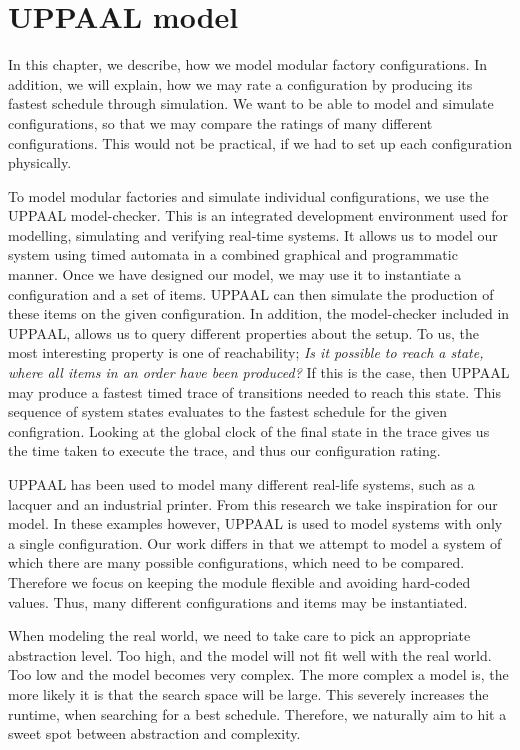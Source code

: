 \chapter{UPPAAL model}\label{ch:uppaalmodel}
In this chapter, we describe, how we model modular factory configurations. In addition, we will explain, how we may rate a configuration by producing its fastest schedule through simulation. We want to be able to model and simulate configurations, so that we may compare the ratings of many different configurations. This would not be practical, if we had to set up each configuration physically.

To model modular factories and simulate individual configurations, we use the UPPAAL model-checker\cite{Larsen97uppaalin}. This is an integrated development environment used for modelling, simulating and verifying real-time systems. It allows us to model our system using timed automata in a combined graphical and programmatic manner. Once we have designed our model, we may use it to instantiate a configuration and a set of items. UPPAAL can then simulate the production of these items on the given configuration. In addition, the model-checker included in UPPAAL, allows us to query different properties about the setup. To us, the most interesting property is one of reachability; \textit{Is it possible to reach a state, where all items in an order have been produced?} If this is the case, then UPPAAL may produce a fastest timed trace of transitions needed to reach this state. This sequence of system states evaluates to the fastest schedule for the given configration. Looking at the global clock of the final state in the trace gives us the time taken to execute the trace, and thus our configuration rating.

UPPAAL has been used to model many different real-life systems, such as a lacquer\cite{so54514} and an industrial printer\cite{Igna2008}. From this research we take inspiration for our model. In these examples however, UPPAAL is used to model systems with only a single configuration. Our work differs in that we attempt to model a system of which there are many possible configurations, which need to be compared. Therefore we focus on keeping the module flexible and avoiding hard-coded values. Thus, many different configurations and items may be instantiated.

When modeling the real world, we need to take care to pick an appropriate abstraction level. Too high, and the model will not fit well with the real world. Too low and the model becomes very complex. The more complex a model is, the more likely it is that the search space will be large. This severely increases the runtime, when searching for a best schedule. Therefore, we naturally aim to hit a sweet spot between abstraction and complexity.

